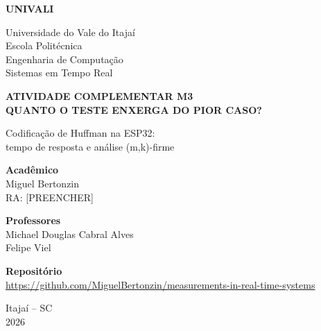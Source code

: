 \begin{titlepage}
\centering
{\color{institucional}\bfseries\fontsize{24.88}{30}\selectfont UNIVALI\par}
\vspace{10pt}
Universidade do Vale do Itajaí\\
Escola Politécnica\\
Engenharia de Computação\\
Sistemas em Tempo Real
\vfill
{\bfseries\fontsize{17.28}{21}\selectfont ATIVIDADE COMPLEMENTAR M3\\
QUANTO O TESTE ENXERGA DO PIOR CASO?\par}
\vspace{14pt}
{\fontsize{14.4}{18}\selectfont Codificação de Huffman na ESP32:\\
tempo de resposta e análise (m,k)-firme\par}
\vfill
\textbf{Acadêmico}\\
Miguel Bertonzin\\ RA: [PREENCHER]
\vspace{20pt}

\textbf{Professores}\\
Michael Douglas Cabral Alves\\ Felipe Viel
\vspace{20pt}

{\fontsize{9}{12}\selectfont\textbf{Repositório}\\
\url{https://github.com/MiguelBertonzin/measurements-in-real-time-systems}\par}
\vfill
Itajaí -- SC\\
2026
\end{titlepage}

